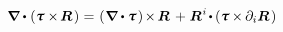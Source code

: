 \begin{otherlanguage}{russian}
\nopagebreak\vspace{-0.2em}\begin{equation*}
\tikzmark{divergenceOfStressCrossLocationBegin} \hspace{-0.2ex} \boldnabla \dotp \hspace{.1ex} \left( \cauchystress \times \hspace{-0.24ex} \bm{R} \hspace{.24ex} \right) \hspace{-0.33ex} \tikzmark{divergenceOfStressCrossLocationEnd}
= \hspace{-0.33ex} \tikzmark{firstTermOfStressCrossLocationDivergenceBegin} \hspace{.1ex} \left( \hspace{.12ex} \boldnabla \dotp \cauchystress \hspace{.2ex} \right) \hspace{-0.25ex} \times \hspace{-0.2ex} \bm{R} \hspace{.2ex} \tikzmark{firstTermOfStressCrossLocationDivergenceEnd} \hspace{.15ex}
+ \hspace{.1ex} \bm{R}^{\hspace{.1ex}i} \hspace{-0.25ex} \dotp \hspace{-0.1ex} \left( \cauchystress \hspace{-0.1ex} \times \hspace{-0.12ex} \partial_i \bm{R} \hspace{.24ex} \right)
\end{equation*}
%


\end{otherlanguage}
